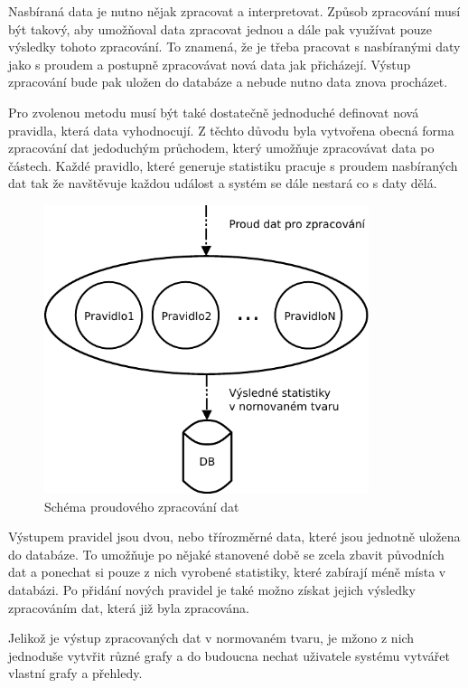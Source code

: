 \documentclass[bc,female,java,dept456]{diploma}						%
\begin{document}
Nasbíraná data je nutno nějak zpracovat a interpretovat. Způsob zpracování musí být takový, aby umožňoval data zpracovat jednou a dále pak využívat pouze výsledky tohoto zpracování. To znamená, že je třeba pracovat s nasbíranými daty jako s proudem a postupně zpracovávat nová data jak přicházejí. Výstup zpracování bude pak uložen do databáze a nebude nutno data znova procházet.

Pro zvolenou metodu musí být také dostatečně jednoduché definovat nová pravidla, která data vyhodnocují. Z těchto důvodu byla vytvořena obecná forma zpracování dat jedoduchým průchodem, který umožňuje zpracovávat data po částech. Každé pravidlo, které generuje statistiku pracuje s proudem nasbíraných dat tak že navštěvuje každou událost a systém se dále nestará co s daty dělá.


\begin{figure}[h]
	\centering
	\includegraphics[width=9.5cm]{img/zpracovani_2.pdf}
	\caption{Schéma proudového zpracování dat}
	\label{img:measuring}
\end{figure}

Výstupem pravidel jsou dvou, nebo třírozměrné data, které jsou jednotně uložena do databáze. To umožňuje po nějaké stanovené době se zcela zbavit původních dat a ponechat si pouze z nich vyrobené statistiky, které zabírají méně místa v databázi. Po přidání nových pravidel je také možno získat jejich výsledky zpracováním dat, která již byla zpracována.

Jelikož je výstup zpracovaných dat v normovaném tvaru, je mžono z nich jednoduše vytvřit různé grafy a do budoucna nechat uživatele systému vytvářet vlastní grafy a přehledy.

\end{document}
